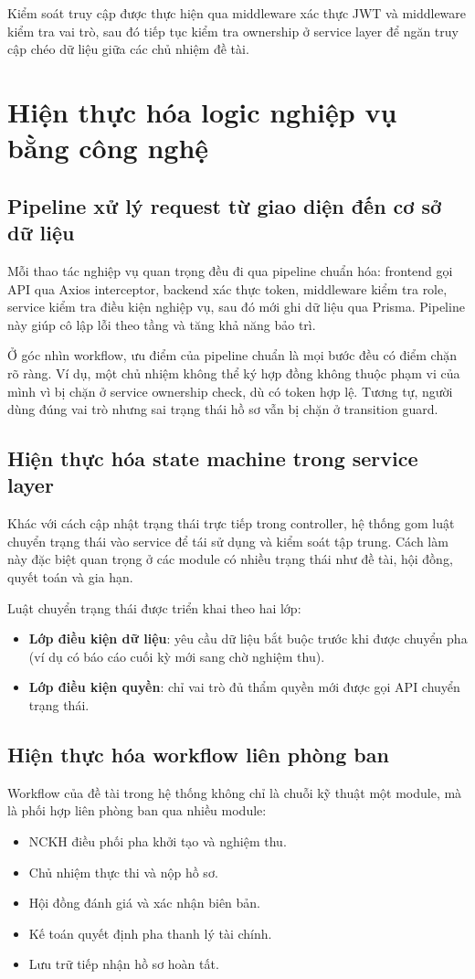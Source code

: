 \documentclass[12pt,a4paper]{report}
\begin{document}
Kiểm soát truy cập được thực hiện qua middleware xác thực JWT và middleware kiểm tra vai trò, sau đó tiếp tục kiểm tra ownership ở service layer để ngăn truy cập chéo dữ liệu giữa các chủ nhiệm đề tài.

\section{Hiện thực hóa logic nghiệp vụ bằng công nghệ}
\subsection{Pipeline xử lý request từ giao diện đến cơ sở dữ liệu}
Mỗi thao tác nghiệp vụ quan trọng đều đi qua pipeline chuẩn hóa: frontend gọi API qua Axios interceptor, backend xác thực token, middleware kiểm tra role, service kiểm tra điều kiện nghiệp vụ, sau đó mới ghi dữ liệu qua Prisma. Pipeline này giúp cô lập lỗi theo tầng và tăng khả năng bảo trì.

Ở góc nhìn workflow, ưu điểm của pipeline chuẩn là mọi bước đều có điểm chặn rõ ràng. Ví dụ, một chủ nhiệm không thể ký hợp đồng không thuộc phạm vi của mình vì bị chặn ở service ownership check, dù có token hợp lệ. Tương tự, người dùng đúng vai trò nhưng sai trạng thái hồ sơ vẫn bị chặn ở transition guard.

\subsection{Hiện thực hóa state machine trong service layer}
Khác với cách cập nhật trạng thái trực tiếp trong controller, hệ thống gom luật chuyển trạng thái vào service để tái sử dụng và kiểm soát tập trung. Cách làm này đặc biệt quan trọng ở các module có nhiều trạng thái như đề tài, hội đồng, quyết toán và gia hạn.

Luật chuyển trạng thái được triển khai theo hai lớp:
\begin{itemize}[leftmargin=1.2cm]
\item \textbf{Lớp điều kiện dữ liệu}: yêu cầu dữ liệu bắt buộc trước khi được chuyển pha (ví dụ có báo cáo cuối kỳ mới sang chờ nghiệm thu).
\item \textbf{Lớp điều kiện quyền}: chỉ vai trò đủ thẩm quyền mới được gọi API chuyển trạng thái.
\end{itemize}

\subsection{Hiện thực hóa workflow liên phòng ban}
Workflow của đề tài trong hệ thống không chỉ là chuỗi kỹ thuật một module, mà là phối hợp liên phòng ban qua nhiều module:
\begin{itemize}[leftmargin=1.2cm]
\item NCKH điều phối pha khởi tạo và nghiệm thu.
\item Chủ nhiệm thực thi và nộp hồ sơ.
\item Hội đồng đánh giá và xác nhận biên bản.
\item Kế toán quyết định pha thanh lý tài chính.
\item Lưu trữ tiếp nhận hồ sơ hoàn tất.
\end{itemize}
\end{document}
